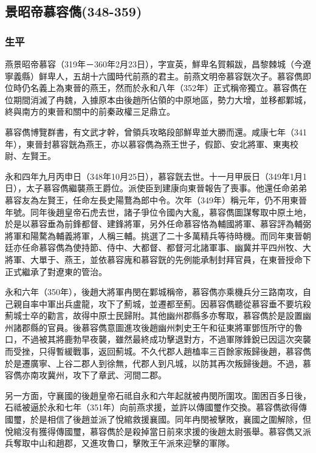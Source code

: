 
\subsection{景昭帝慕容儁\tiny(348-359)}

\subsubsection{生平}

燕景昭帝慕容（319年－360年2月23日），字宣英，鮮卑名賀賴跋，昌黎棘城（今遼寧義縣）鲜卑人，五胡十六國時代前燕的君主。前燕文明帝慕容皝次子。慕容儁即位時仍名義上為東晉的燕王，然而於永和八年（352年）正式稱帝獨立。慕容儁在位期間消滅了冉魏，入據原本由後趙所佔領的中原地區，勢力大增，並移都鄴城，終與南方的東晉和關中的前秦政權三足鼎立。

慕容儁博覽群書，有文武才幹，曾領兵攻略段部鮮卑並大勝而還。咸康七年（341年），東晉封慕容皝為燕王，亦以慕容儁為燕王世子，假節、安北將軍、東夷校尉、左賢王。

永和四年九月丙申日（348年10月25日），慕容皝去世。十一月甲辰日（349年1月1日），太子慕容儁繼襲燕王爵位。派使臣到建康向東晉報告了喪事。他還任命弟弟慕容友為左賢王，任命左長史陽鶩為郎中令。次年（349年）稱元年，仍不用東晉年號。同年後趙皇帝石虎去世，諸子爭位令國內大亂，慕容儁圖謀奪取中原土地，於是以慕容垂為前鋒都督、建鋒將軍，另外任命慕容恪為輔國將軍、慕容評為輔弼將軍和陽騖為輔義將軍，人稱三輔。挑選了二十多萬精兵等待時機。而同年東晉朝廷亦任命慕容儁為使持節、侍中、大都督、都督河北諸軍事、幽冀并平四州牧、大將軍、大單于、燕王，並依慕容廆和慕容皝的先例能承制封拜官員，在東晉授命下正式繼承了對遼東的管治。

永和六年（350年），後趙大將軍冉閔在鄴城稱帝，慕容儁亦乘機兵分三路南攻，自己親自率中軍出兵盧龍，攻下了薊城，並遷都至薊。因慕容儁聽從慕容垂不要坑殺薊城士卒的勸言，故得中原士民歸附。其他幽州郡縣多亦奪取，慕容儁於是設置幽州諸郡縣的官員。後慕容儁意圖進攻後趙幽州刺史王午和征東將軍鄧恆所守的魯口，不過被其將鹿勃早夜襲，雖然最終成功擊退對方，不過軍隊鋒銳已因這次突襲而受挫，只得暫緩戰事，返回薊城。不久代郡人趙榼率三百餘家叛歸後趙，慕容儁於是遷廣寧、上谷二郡人到徐無，代郡人到凡城，以防其再次叛歸後趙。不過，慕容儁亦南攻冀州，攻下了章武、河間二郡。

另一方面，守襄國的後趙皇帝石祗自永和六年起就被冉閔所圍攻。圍困百多日後，石祗被逼於永和七年（351年）向前燕求援，並許以傳國璽作交換。慕容儁欲得傳國璽，於是相信了後趙並派了悅綰救援襄國。同年冉閔被擊敗，襄國之圍解除，但悅綰沒有獲得傳國璽，慕容儁於是殺掉當日前來求援的後趙太尉張舉。慕容儁又派兵奪取中山和趙郡，又進攻魯口，擊敗王午派來迎擊的軍隊。


